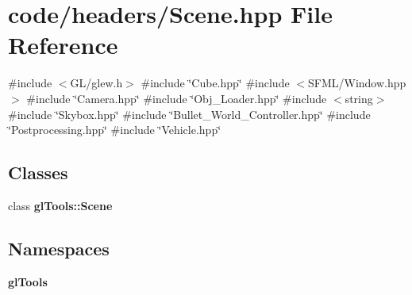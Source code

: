\section{code/headers/\+Scene.hpp File Reference}
\label{_scene_8hpp}
{\ttfamily \#include $<$G\+L/glew.\+h$>$}\newline
{\ttfamily \#include \char`\"{}Cube.\+hpp\char`\"{}}\newline
{\ttfamily \#include $<$S\+F\+M\+L/\+Window.\+hpp$>$}\newline
{\ttfamily \#include \char`\"{}Camera.\+hpp\char`\"{}}\newline
{\ttfamily \#include \char`\"{}Obj\+\_\+\+Loader.\+hpp\char`\"{}}\newline
{\ttfamily \#include $<$string$>$}\newline
{\ttfamily \#include \char`\"{}Skybox.\+hpp\char`\"{}}\newline
{\ttfamily \#include \char`\"{}Bullet\+\_\+\+World\+\_\+\+Controller.\+hpp\char`\"{}}\newline
{\ttfamily \#include \char`\"{}Postprocessing.\+hpp\char`\"{}}\newline
{\ttfamily \#include \char`\"{}Vehicle.\+hpp\char`\"{}}\newline
\subsection*{Classes}
\begin{DoxyCompactItemize}
\item 
class \textbf{ gl\+Tools\+::\+Scene}
\end{DoxyCompactItemize}
\subsection*{Namespaces}
\begin{DoxyCompactItemize}
\item 
 \textbf{ gl\+Tools}
\end{DoxyCompactItemize}
